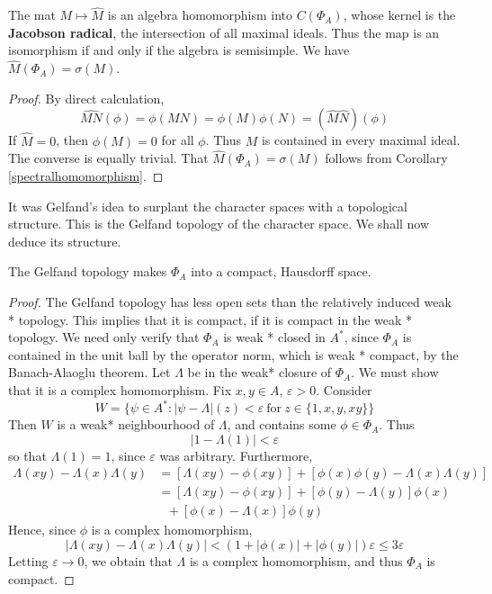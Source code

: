 \begin{lemma}
    The mat $M \mapsto \widehat{M}$ is an algebra homomorphism into $C(\Phi_A)$, whose kernel is the {\bf Jacobson radical}, the intersection of all maximal ideals. Thus the map is an isomorphism if and only if the algebra is semisimple. We have $\widehat{M}(\Phi_A) = \sigma(M)$.
\end{lemma}
\begin{proof}
    By direct calculation,
    \[ \widehat{MN}(\phi) = \phi(MN) = \phi(M) \phi(N) = (\widehat{M} \widehat{N})(\phi) \]
    If $\widehat{M} = 0$, then $\phi(M) = 0$ for all $\phi$. Thus $M$ is contained in every maximal ideal. The converse is equally trivial. That $\widehat{M}(\Phi_A) = \sigma(M)$ follows from Corollary \ref{spectralhomomorphism}.
\end{proof}

It was Gelfand's idea to surplant the character spaces with a topological structure. This is the Gelfand topology of the character space. We shall now deduce its structure.

\begin{theorem}
    The Gelfand topology makes $\Phi_A$ into a compact, Hausdorff space.
\end{theorem}
\begin{proof}
    The Gelfand topology has less open sets than the relatively induced weak * topology. This implies that it is compact, if it is compact in the weak * topology. We need only verify that $\Phi_A$ is weak * closed in $A^*$, since $\Phi_A$ is contained in the unit ball by the operator norm, which is weak * compact, by the Banach-Alaoglu theorem. Let $\Lambda$ be in the weak* closure of $\Phi_A$. We must show that it is a complex homomorphism. Fix $x,y \in A$, $\varepsilon > 0$. Consider
    \[ W = \{ \psi \in A^* : | \psi - \Lambda | (z) < \varepsilon\ \text{for}\ z \in \{ 1, x, y, xy \} \} \]
    Then $W$ is a weak* neighbourhood of $\Lambda$, and contains some $\phi \in \Phi_A$. Thus
    \[ | 1 - \Lambda(1) | < \varepsilon \]
    so that $\Lambda(1) = 1$, since $\varepsilon$ was arbitrary. Furthermore,
    \begin{align*}
        \Lambda(xy) -   \Lambda(x) \Lambda(y) &= [\Lambda(xy) - \phi(xy)] + [\phi(x)\phi(y) - \Lambda(x)\Lambda(y)]\\
        &= [\Lambda(xy) - \phi(xy)] + [\phi(y) - \Lambda(y)] \phi(x)\\
        &\ \ \ + [\phi(x) - \Lambda(x)] \phi(y)
    \end{align*}
    Hence, since $\phi$ is a complex homomorphism,
    \[ | \Lambda(xy) -   \Lambda(x) \Lambda(y) | < (1 + |\phi(x)| + |\phi(y)|) \varepsilon \leq 3 \varepsilon \]
    Letting $\varepsilon \to 0$, we obtain that $\Lambda$ is a complex homomorphism, and thus $\Phi_A$ is compact.
\end{proof}

